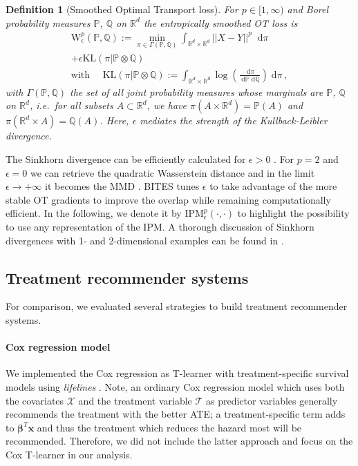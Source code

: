 \documentclass{article}
\newcommand{\myvec}[1]{\boldsymbol{#1}}
\renewcommand{\d}{\;\mathrm{d}}
\newtheorem{definition}{Definition}[section]
\begin{document}
	\begin{definition}[Smoothed Optimal Transport loss]
		\itshape
		For $p\in[1,\infty)$ and Borel probability measures $\mathbb{P}$, $\mathbb{Q}$ on $\mathbb{R}^d$ the entropically smoothed OT loss is
		\begin{align*}
		\text{W}_\epsilon^p(\mathbb{P},\mathbb{Q}):=\min_{\pi\in\Gamma(\mathbb{P},\mathbb{Q})} \int_{\mathbb{R}^d\times\mathbb{R}^d} ||X-Y||^p\;\d\pi\\
		+ \epsilon \text{KL}(\pi|\mathbb{P}\otimes \mathbb{Q})\\
		\text{with    }\quad\text{KL}(\pi|\mathbb{P}\otimes \mathbb{Q}):=\int_{\mathbb{R}^d\times\mathbb{R}^d} \log\left(\frac{\d\pi}{\d \mathbb{P}\d \mathbb{Q}}\right) \d\pi\,,
		\end{align*}
		with $\Gamma(\mathbb{P},\mathbb{Q})$ the set of all joint probability measures whose marginals are $\mathbb{P}$, $\mathbb{Q}$ on $\mathbb{R}^d$, i.e.~for all subsets $A\subset \mathbb{R}^d$, we have $\pi(A\times\mathbb{R}^d)=\mathbb{P}(A)$ and $\pi(\mathbb{R}^d\times A)=\mathbb{Q}(A)$. Here, $\epsilon$ mediates the strength of the Kullback-Leibler divergence.
	\end{definition}
	The Sinkhorn divergence can be efficiently calculated for $\epsilon>0$ \cite{Cuturi.2013}. For $p=2$ and $\epsilon=0$ we can retrieve the quadratic Wasserstein distance and in the limit $\epsilon \rightarrow +\infty$ it becomes the MMD \cite{Genevay.2017}. BITES tunes $\epsilon$ to take advantage of the more stable OT gradients to improve the overlap while remaining computationally efficient. In the following, we denote it by $\text{IPM}_\epsilon^p(\cdot,\cdot)$ to highlight the possibility to use any representation of the IPM. A thorough discussion of Sinkhorn divergences with 1- and 2-dimensional examples can be found in \cite{Feydy.2018}. 
	
	
	\subsection{Treatment recommender systems}
	For comparison, we evaluated several strategies to build treatment recommender systems. 
	
	\paragraph{Cox regression model} We implemented the Cox regression as T-learner with treatment-specific survival models using \textit{lifelines} \cite{DavidsonPilon.2021}. Note, an ordinary Cox regression model which uses both the covariates $\mathcal X$ and the treatment variable $\mathcal T$ as predictor variables generally recommends the treatment with the better ATE; a treatment-specific term adds to $\myvec{\beta}^T\myvec{x}$ and thus the treatment which reduces the hazard most will be recommended. Therefore, we did not include the latter approach and focus on the Cox T-learner in our analysis.
	
\end{document}
